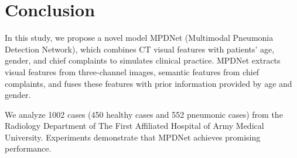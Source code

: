 \documentclass[journal]{IEEEtran}
\begin{document}
\section{Conclusion}
\label{conclude}
In this study, we propose a novel model MPDNet (Multimodal Pneumonia Detection Network), which combines CT visual features with patients' age, gender, and chief complaints to simulates clinical practice. 
MPDNet extracts visual features from three-channel images, semantic features from chief complaints, and fuses these features with prior information provided by age and gender.

We analyze 1002 cases (450 healthy cases and 552 pneumonic cases) from the Radiology Department of The First Affiliated Hospital of Army Medical University. Experiments demonstrate that MPDNet achieves promising performance.


%
%

\end{document}
